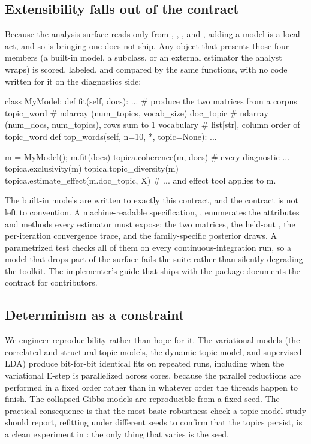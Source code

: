 \documentclass[article,nojss]{jss}
\begin{document}
\subsection{Extensibility falls out of the contract}

Because the analysis surface reads only from ,
, , and , adding a model is a
local act, and so is bringing one  does not ship. Any object that
presents those four members (a built-in model, a subclass, or an external
estimator the analyst wraps) is scored, labeled, and compared by the
same functions, with no code written for it on the diagnostics side:

\begin{CodeChunk}
\begin{CodeInput}
class MyModel:
    def fit(self, docs): ...   # produce the two matrices from a corpus
    topic_word                 # ndarray (num_topics, vocab_size)
    doc_topic                  # ndarray (num_docs, num_topics), rows sum to 1
    vocabulary                 # list[str], column order of topic_word
    def top_words(self, n=10, *, topic=None): ...

m = MyModel(); m.fit(docs)
topica.coherence(m, docs)          # every diagnostic ...
topica.exclusivity(m)
topica.topic_diversity(m)
topica.estimate_effect(m.doc_topic, X)   # ... and effect tool applies to m.
\end{CodeInput}
\end{CodeChunk}

The built-in models are written to exactly this contract, and the contract is not
left to convention. A machine-readable specification, ,
enumerates the attributes and methods every estimator must expose: the two
matrices, the held-out , the per-iteration convergence trace, and
the family-specific posterior draws. A parametrized test checks all of them on
every continuous-integration run, so a model that drops part of the surface fails
the suite rather than silently degrading the toolkit. The implementer's guide that
ships with the package documents the contract for contributors.

\subsection{Determinism as a constraint}

We engineer reproducibility rather than hope for it. The
variational models (the correlated and structural topic models, the dynamic topic
model, and supervised LDA) produce bit-for-bit identical fits on repeated runs,
including when the variational E-step is parallelized across cores, because the
parallel reductions are performed in a fixed order rather than in whatever order
the threads happen to finish. The collapsed-Gibbs models are reproducible from a
fixed seed. The practical consequence is that the most basic robustness check a
topic-model study should report, refitting under different seeds to confirm that
the topics persist, is a clean experiment in : the only thing that
varies is the seed.
\end{document}
